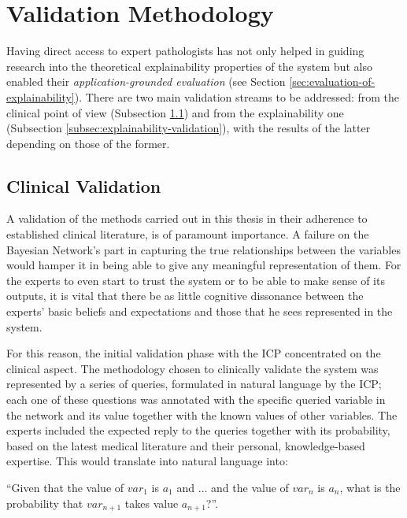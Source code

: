\section{Validation Methodology} \label{sec:validation}
Having direct access to expert pathologists has not only helped in guiding research into the theoretical explainability properties of the system but also enabled their \textit{application-grounded evaluation} (see Section \ref{sec:evaluation-of-explainability}).
There are two main validation streams to be addressed: from the clinical point of view (Subsection \ref{subsec:clinical-validation-methodology}) and from the explainability one (Subsection \ref{subsec:explainability-validation}), with the results of the latter depending on those of the former.
 
\subsection{Clinical Validation} \label{subsec:clinical-validation-methodology}
A validation of the methods carried out in this thesis in their adherence to established clinical literature, is of paramount importance.
A failure on the Bayesian Network's part in capturing the true relationships between the variables would hamper it in being able to give any meaningful representation of them.
For the experts to even start to trust the system or to be able to make sense of its outputs, it is vital that there be as little cognitive dissonance between the experts' basic beliefs and expectations and those that he sees represented in the system.

For this reason, the initial validation phase with the ICP concentrated on the clinical aspect.
The methodology chosen to clinically validate the system was represented by a series of queries, formulated in natural language by the ICP; each one of these questions was annotated with the specific queried variable in the network and its value together with the known values of other variables.
The experts included the expected reply to the queries together with its probability, based on the latest medical literature and their personal, knowledge-based expertise.
This would translate into natural language into:
\begin{center}
\enquote{Given that the value of $var_1$ is $a_1$ and $\ldots$ and the value of $var_n$ is $a_n$, what is the probability that $var_{n+1}$ takes value $a_{n+1}$?}.	
\end{center}

